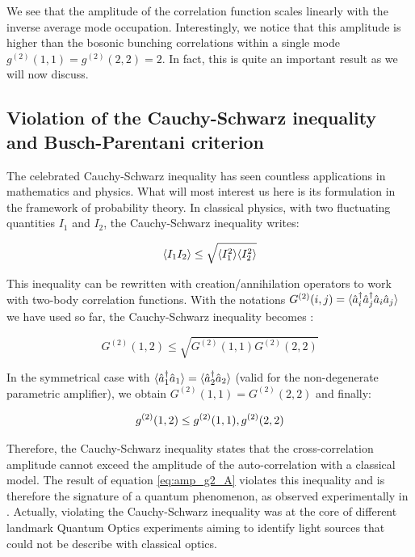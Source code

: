 \noindent We see that the amplitude of the correlation function scales linearly with the inverse average mode occupation. Interestingly, we notice that this amplitude is higher than the bosonic bunching correlations within a single mode $g^{(2)}(1,1)=g^{(2)}(2,2)=2$. In fact, this is quite an important result as we will now discuss.

\subsection{Violation of the Cauchy-Schwarz inequality and Busch-Parentani criterion}

\label{sec:cs_inequality}

The celebrated Cauchy-Schwarz inequality has seen countless applications in mathematics and physics. What will most interest us here is its formulation in the framework of probability theory. In classical physics, with two fluctuating quantities $I_1$ and $I_2$, the Cauchy-Schwarz inequality writes:

\begin{equation}
    \langle I_1 I_2\rangle \leq \sqrt{\langle I_1^2\rangle \langle I_2^2\rangle}
\end{equation}

This inequality can be rewritten with creation/annihilation operators to work with two-body correlation functions. With the notations $G^{(2)}(i,j) = \langle\hat{a}_i^{\dagger} \hat{a}_j^{\dagger} \hat{a}_i \hat{a}_j\rangle$ we have used so far, the Cauchy-Schwarz inequality becomes \cite{walls2008}:

\begin{equation}
    G^{(2)}(1,2) \leq \sqrt{G^{(2)}(1,1) G^{(2)}(2,2) }
\end{equation}

In the symmetrical case with $\langle\hat{a}^{\dagger}_1 \hat{a}_1\rangle=\langle\hat{a}^{\dagger}_2 \hat{a}_2\rangle$ (valid for the non-degenerate parametric amplifier), we obtain $G^{(2)}(1,1)=G^{(2)}(2,2)$ and finally:

\begin{equation}
    g^{(2)} (1,2) \leq g^{(2)} (1,1), g^{(2)} (2,2)
\end{equation}


Therefore, the Cauchy-Schwarz inequality states that the cross-correlation amplitude cannot exceed the amplitude of the auto-correlation with a classical model. The result of equation \ref{eq:amp_g2_A} violates this inequality and is therefore the signature of a quantum phenomenon, as observed experimentally in \cite{zou1991violation}. Actually, violating the Cauchy-Schwarz inequality was at the core of different landmark Quantum Optics experiments \cite{reid1986violations} aiming to identify light sources that could not be describe with classical optics.



